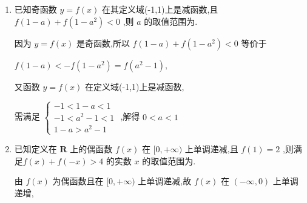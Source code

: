 \begin{enumerate}
\begin{jieda}
        所以 ${2b}{x}^{2} = 0$ 恒成立,即 $b = 0$ .
        
        又因为奇函数的定义域关于原点对称,
        
        所以 $1 - {3a} + \left( {a + 1}\right)  = 0$ ,解得 $a = 1$ ,
        
        因此 $f\left( x\right)  = {x}^{3} + x,x \in  \left\lbrack  {-2,2}\right\rbrack$ ,
        
        由 $y = {x}^{3}$ 单调递增, $y = x$ 单调递增,
        
        易知函数 $f\left( x\right)$ 单调递增,
        
        故 $f\left( {{3x} + b}\right)  + f\left( {x + a}\right)  \geq  0$ 等价于 $f\left( {3x}\right)  + f\left( {x + 1}\right)  \geq  0$
        
        等价于 $f\left( {3x}\right)  \geq   - f\left( {x + 1}\right)  = f\left\lbrack  {-\left( {x + 1}\right) }\right\rbrack$
        
        即 $\left\{  \begin{array}{l} {3x} \geq   - \left( {x + 1}\right) \\   - 2 \leq  {3x} \leq  2 \\   - 2 \leq  x + 1 \leq  2 \end{array}\right.$ ,解得 $x \in  \left\lbrack  {-\dfrac{1}{4},\dfrac{2}{3}}\right\rbrack$ .
    \end{jieda}
    \item 已知奇函数 $y = f\left( x\right)$ 在其定义域(-1,1)上是减函数,且 $f\left( {1 - a}\right)  + f\left( {1 - {a}^{2}}\right)  < 0$ ,则 $a$ 的取值范围为.
    \begin{jieda}
        因为 $y = f\left( x\right)$ 是奇函数,所以 $f\left( {1 - a}\right)  + f\left( {1 - {a}^{2}}\right)  < 0$ 等价于
        
        $f\left( {1 - a}\right)  <  - f\left( {1 - {a}^{2}}\right)  = f\left( {{a}^{2} - 1}\right) ,$
        
        又函数 $y = f\left( x\right)$ 在定义域(-1,1)上是减函数,
        
        需满足 $\left\{  \begin{array}{l}  - 1 < 1 - a < 1 \\   - 1 < {a}^{2} - 1 < 1 \\  1 - a > {a}^{2} - 1 \end{array}\right.$ ,解得 $0 < a < 1$ 
    \end{jieda}
    \item 已知定义在 $\mathbf{R}$ 上的偶函数 $f\left( x\right)$ 在 $\lbrack 0, + \infty )$ 上单调递减,且 $f\left( 1\right)  = 2$ ,则满足$f\left( x\right)  + f\left( {-x}\right)  > 4$ 的实数 $x$ 的取值范围为.
    \begin{jieda}
        由 $f\left( x\right)$ 为偶函数且在 $\lbrack 0, + \infty )$ 上单调递减,故 $f\left( x\right)$ 在 $\left( {-\infty ,0}\right)$ 上单调递增,
        

\end{jieda}
\end{enumerate}
